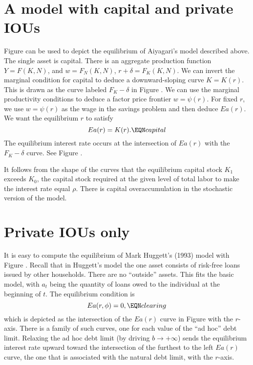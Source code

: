 \section{A model with capital and private IOUs}

  Figure  can be used to depict the equilibrium of Aiyagari's model
described above.  The single asset is capital.
    There is an aggregate production function
$Y = F(K,N)$, and $w = F_N(K,N)$, $r + \delta = F_K(K,N)$.
  We can  invert
the marginal  condition for capital to deduce
a downward-sloping curve
$K=K(r)$. This is drawn as the curve labeled
$F_K - \delta$ in Figure .  We can  use  the marginal
productivity conditions  to deduce a
factor price frontier $w=\psi(r)$.  For fixed  $r$,
we use $w=\psi(r)$  as the wage in the
savings problem and then deduce $E a(r)$. We want
the equilibrium $r$ to satisfy
$$ E a(r) = K(r). \EQN capital $$
The equilibrium interest rate occurs at the intersection
of $E a(r)$ with the $F_K - \delta$ curve.  See Figure .

It follows from the shape of the curves that the equilibrium
capital stock $K_1$ exceeds $K_0$, the capital stock required
at the given level of total labor to make the interest rate equal
$\rho$.  There is capital overaccumulation in
the stochastic version of the  model.


\section{Private IOUs only}
It is easy to compute the equilibrium of
   Mark Huggett's (1993) model with Figure .
Recall that in Huggett's model the one asset   consists of risk-free
loans issued by
other  households.  There are no ``outside'' assets.  This fits
the basic model, with $a_t$ being the quantity of loans owed to
the individual at the beginning of $t$.  The equilibrium
condition is
$$   E a(r,\phi) = 0,  \EQN clearing $$
which is depicted as the intersection of the $E a(r)$ curve in
Figure  with  the $r$-axis.  There is a family of such
curves, one for each value of the ``ad hoc'' debt limit.  Relaxing
the ad hoc debt limit (by driving $b \rightarrow + \infty$) sends
the equilibrium   interest rate upward toward the intersection
of the furthest to the left  $E a(r)$ curve, the one that is
associated with the
natural debt limit,  with the $r$-axis.


